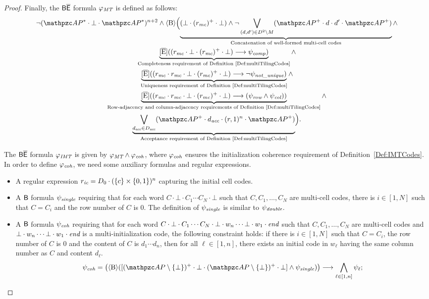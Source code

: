 \begin{proof}
Finally, the $\mathsf{B\overline{E}}$ formula  $\varphi_{\textit{MT}}$ is defined as follows:
\begin{multline*}
\neg (\Prop^{*}\cdot \bot \cdot \Prop^{*})^{n+2} \wedge
 \hsB \Bigl(\underbrace{(\bot\cdot (r_{\MC})^{+} \cdot \bot)\wedge\neg \bigvee_{(d,d')\in D^{2}\setminus M}(\Prop^{+}\cdot d\cdot d'\cdot \Prop^{+})}_{\text{Concatenation of well-formed multi-cell codes}}\wedge
\\
 \underbrace{\hsEtu((r_{\MC}\cdot \bot\cdot (r_{\MC})^{+} \cdot \bot) \longrightarrow \psi_\Complete)}_{\text{Completeness requirement of Definition \ref{Def:multiTilingCodes}}}\wedge
 \\
\underbrace{\hsEtu((r_{\MC}\cdot r_{\MC}\cdot \bot\cdot (r_{\MC})^{+} \cdot \bot) \longrightarrow \neg\psi_{\NU})}_{\text{Uniqueness requirement of Definition \ref{Def:multiTilingCodes}}}\wedge
\\
\underbrace{\hsEtu((r_{\MC}\cdot r_{\MC}\cdot \bot\cdot (r_{\MC})^{+} \cdot \bot) \longrightarrow (\psi_{\Row}\wedge \psi_{\Column}))}_{\text{Row-adjacency and column-adjacency requirements of Definition \ref{Def:multiTilingCodes}}}\wedge
\\
\underbrace{\bigvee_{d_\acc\in D_\acc}(\Prop^{+}\cdot d_\acc \cdot (r,1)^{n}\cdot \Prop^{+}) }_{\text{Acceptance requirement of Definition \ref{Def:multiTilingCodes}}}\Bigr).
\end{multline*}

The $\mathsf{B\overline{E}}$ formula $\varphi_{\textit{IMT}}$ is given by
$\varphi_{\textit{MT}}\wedge \varphi_{\textit{coh}}$,
where $\varphi_{\textit{coh}}$ ensures the initialization coherence requirement of Definition~\ref{Def:IMTCodes}. In order to define
$\varphi_{\textit{coh}}$, we need some auxiliary formulas and regular expressions.
\begin{itemize}
\item A regular expression $r_{\textit{ic}} = D_0 \cdot   (\{c\}\times \{0,1\})^{n}$ capturing the  initial cell codes.
\item    A $\mathsf{B}$ formula $\psi_{\textit{single}}$ requiring that for each word $C\cdot   \bot \cdot C_1 \cdots C_N\cdot \bot$ such that
  $C, C_1,\ldots,C_N$ are multi-cell codes,
   there is $i\in [1,N]$ such that $C=C_i$ and  the row number of $C$ is $0$. The definition of $\psi_{\textit{single}}$ is similar to $\psi_{\textit{double}}$.
 \item A $\mathsf{B}$ formula $\psi_{\textit{coh}}$ requiring that for each word $C\cdot   \bot \cdot C_1 \cdots C_N\cdot \bot \cdot w_n \cdots \bot \cdot w_1 \cdot \textit{end}$ such that   $C, C_1,\ldots,C_N$ are multi-cell codes and $\bot \cdot w_n \cdots \bot \cdot w_1 \cdot \textit{end}$ is a multi-initialization code, the following constraint holds:
     if   there is $i\in [1,N]$ such that $C=C_i$, the row number of $C$ is $0$ and the content of $C$ is $d_1\cdots d_n$, then for all $\ell\in [1,n]$, there exists an initial code in $w_\ell$ having the same column number as $C$ and content $d_\ell$.
\[
\psi_\Coh  =   \bigl( \hsB( [(\Prop\setminus \{\bot\})^{+} \cdot \bot \cdot (\Prop\setminus \{\bot\})^{+} \cdot \bot] \wedge \psi_\Single)  \bigr) \longrightarrow \displaystyle{\bigwedge_{\ell\in [1,n]}\psi_\ell};
\]


\end{itemize}
\end{proof}

